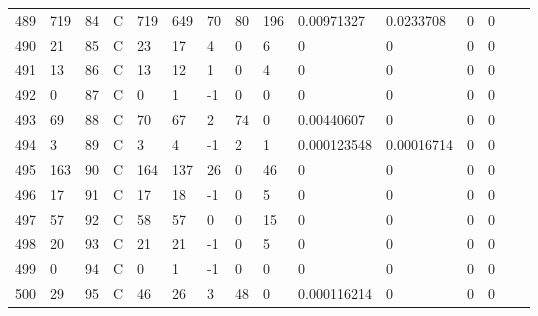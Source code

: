 \begin{longtable}{lllllllllllllll}
	489 & 719               & 84  & C   & 719               & 649               & 70                & 80   & 196        & 0.00971327     & 0.0233708      & 0             & 0            \\
	490 & 21                & 85  & C   & 23                & 17                & 4                 & 0    & 6          & 0              & 0              & 0             & 0            \\
	491 & 13                & 86  & C   & 13                & 12                & 1                 & 0    & 4          & 0              & 0              & 0             & 0            \\
	492 & 0                 & 87  & C   & 0                 & 1                 & -1                & 0    & 0          & 0              & 0              & 0             & 0            \\
	493 & 69                & 88  & C   & 70                & 67                & 2                 & 74   & 0          & 0.00440607     & 0              & 0             & 0            \\
	494 & 3                 & 89  & C   & 3                 & 4                 & -1                & 2    & 1          & 0.000123548    & 0.00016714     & 0             & 0            \\
	495 & 163               & 90  & C   & 164               & 137               & 26                & 0    & 46         & 0              & 0              & 0             & 0            \\
	496 & 17                & 91  & C   & 17                & 18                & -1                & 0    & 5          & 0              & 0              & 0             & 0            \\
	497 & 57                & 92  & C   & 58                & 57                & 0                 & 0    & 15         & 0              & 0              & 0             & 0            \\
	498 & 20                & 93  & C   & 21                & 21                & -1                & 0    & 5          & 0              & 0              & 0             & 0            \\
	499 & 0                 & 94  & C   & 0                 & 1                 & -1                & 0    & 0          & 0              & 0              & 0             & 0            \\
	500 & 29                & 95  & C   & 46                & 26                & 3                 & 48   & 0          & 0.000116214    & 0              & 0             & 0            \\

\end{longtable}
